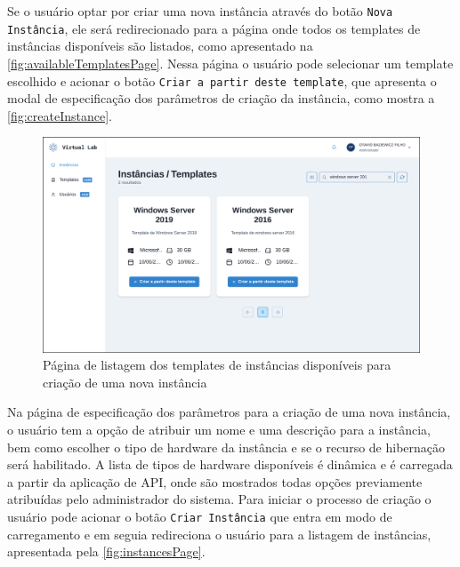 Se o usuário optar por criar uma nova instância através do botão \texttt{Nova Instância}, ele será redirecionado para a página onde todos os templates de instâncias disponíveis são listados, como apresentado na \autoref{fig:availableTemplatesPage}. Nessa página o usuário pode selecionar um template escolhido e acionar o botão \texttt{Criar a partir deste template}, que apresenta o modal de especificação dos parâmetros de criação da instância, como mostra a \autoref{fig:createInstance}.

\begin{figure}[H]
\caption{Página de listagem dos templates de instâncias disponíveis para criação de uma nova instância}
\label{fig:availableTemplatesPage}
\includegraphics[width=\textwidth]{capitulos/3-resultados/files/available-templates.png}
\end{figure}

Na página de especificação dos parâmetros para a criação de uma nova instância, o usuário tem a opção de atribuir um nome e uma descrição para a instância, bem como escolher o tipo de hardware da instância e se o recurso de hibernação será habilitado. A lista de tipos de hardware disponíveis é dinâmica e é carregada a partir da aplicação de API, onde são mostrados todas opções previamente atribuídas pelo administrador do sistema. Para iniciar o processo de criação o usuário pode acionar o botão \texttt{Criar Instância} que entra em modo de carregamento e em seguia redireciona o usuário para a listagem de instâncias, apresentada pela \autoref{fig:instancesPage}.


